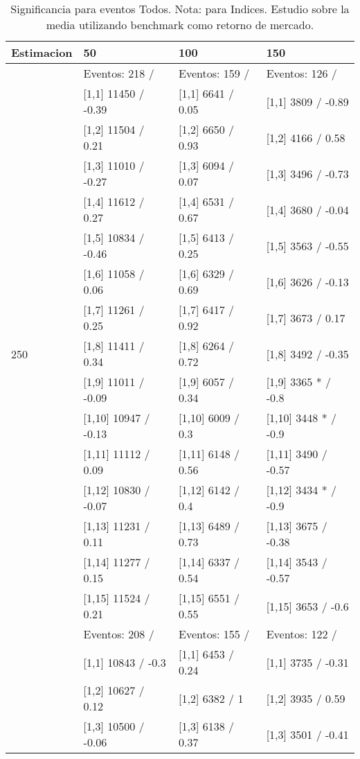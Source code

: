 \begin{table}

\caption{Significancia para eventos Todos. Nota: para Indices. Estudio sobre la media utilizando benchmark como retorno de mercado.}
\centering
\begin{tabular}[t]{llll}
\toprule
Estimacion & 50 & 100 & 150\\
\midrule
 & Eventos:  218 / & Eventos:  159 / & Eventos:  126 /\\
 & {}[1,1] 11450  / -0.39 & {}[1,1] 6641  / 0.05 & {}[1,1] 3809  / -0.89\\
 & {}[1,2] 11504  / 0.21 & {}[1,2] 6650  / 0.93 & {}[1,2] 4166  / 0.58\\
 & {}[1,3] 11010  / -0.27 & {}[1,3] 6094  / 0.07 & {}[1,3] 3496  / -0.73\\
 & {}[1,4] 11612  / 0.27 & {}[1,4] 6531  / 0.67 & {}[1,4] 3680  / -0.04\\
\addlinespace
 & {}[1,5] 10834  / -0.46 & {}[1,5] 6413  / 0.25 & {}[1,5] 3563  / -0.55\\
 & {}[1,6] 11058  / 0.06 & {}[1,6] 6329  / 0.69 & {}[1,6] 3626  / -0.13\\
 & {}[1,7] 11261  / 0.25 & {}[1,7] 6417  / 0.92 & {}[1,7] 3673  / 0.17\\
250 & {}[1,8] 11411  / 0.34 & {}[1,8] 6264  / 0.72 & {}[1,8] 3492  / -0.35\\
 & {}[1,9] 11011  / -0.09 & {}[1,9] 6057  / 0.34 & {}[1,9] 3365 * / -0.8\\
\addlinespace
 & {}[1,10] 10947  / -0.13 & {}[1,10] 6009  / 0.3 & {}[1,10] 3448 * / -0.9\\
 & {}[1,11] 11112  / 0.09 & {}[1,11] 6148  / 0.56 & {}[1,11] 3490  / -0.57\\
 & {}[1,12] 10830  / -0.07 & {}[1,12] 6142  / 0.4 & {}[1,12] 3434 * / -0.9\\
 & {}[1,13] 11231  / 0.11 & {}[1,13] 6489  / 0.73 & {}[1,13] 3675  / -0.38\\
 & {}[1,14] 11277  / 0.15 & {}[1,14] 6337  / 0.54 & {}[1,14] 3543  / -0.57\\
\addlinespace
 & {}[1,15] 11524  / 0.21 & {}[1,15] 6551  / 0.55 & {}[1,15] 3653  / -0.6\\
 & Eventos:  208 / & Eventos:  155 / & Eventos:  122 /\\
 & {}[1,1] 10843  / -0.3 & {}[1,1] 6453  / 0.24 & {}[1,1] 3735  / -0.31\\
 & {}[1,2] 10627  / 0.12 & {}[1,2] 6382  / 1 & {}[1,2] 3935  / 0.59\\
 & {}[1,3] 10500  / -0.06 & {}[1,3] 6138  / 0.37 & {}[1,3] 3501  / -0.41\\

\end{tabular}
\end{table}
